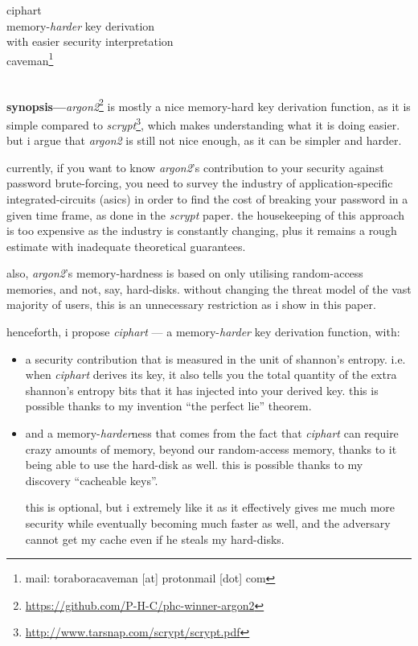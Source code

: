 \documentclass[twocolumn]{article}
\begin{document}
\SetInd{.15em}{1em}

\begin{center}
\Huge
ciphart\\
\LARGE
memory-\emph{harder} key derivation \\
with easier security interpretation\\
\normalsize
caveman\footnote{mail: toraboracaveman [at] protonmail [dot] com}\\
\footnotesize
\DTMnow\\
\end{center}

\noindent\textbf{synopsis---}\emph{argon2}\footnote{\url{https://github.com/P-H-C/phc-winner-argon2}}
is mostly a nice memory-hard key derivation function, as it is simple
compared to
\emph{scrypt}\footnote{\url{http://www.tarsnap.com/scrypt/scrypt.pdf}},
which makes understanding what it is doing easier.  but i argue that
\emph{argon2} is still not nice enough, as it can be simpler and harder.

currently, if you want to know \emph{argon2}'s contribution to your
security against password brute-forcing, you need to survey the industry of
application-specific integrated-circuits (asics) in order to find the cost
of breaking your password in a given time frame, as done in the
\emph{scrypt} paper.  the housekeeping of this approach is too expensive as
the industry is constantly changing, plus it remains a rough estimate with
inadequate theoretical guarantees.

also, \emph{argon2}'s memory-hardness is based on only utilising
random-access memories, and not, say, hard-disks.  without changing the
threat model of the vast majority of users, this is an unnecessary
restriction as i show in this paper.

henceforth, i propose \emph{ciphart} --- a memory-\emph{harder} key
derivation function, with:
\begin{itemize}
    \item a security contribution that is measured in the unit of shannon's
    entropy.  i.e. when \emph{ciphart} derives its key, it also tells you
    the total quantity of the extra shannon's entropy bits that it has
    injected into your derived key.  this is possible thanks to my
    invention ``the perfect lie'' theorem.
    \item and a memory-\emph{harder}ness that comes from the fact that
    \emph{ciphart} can require crazy amounts of memory, beyond our
    random-access memory, thanks to it being able to use the hard-disk as
    well.  this is possible thanks to my discovery ``cacheable keys''.

    this is optional, but i extremely like it as it effectively gives me
    much more security while eventually becoming much faster as well, and
    the adversary cannot get my cache even if he steals my hard-disks.
\end{itemize}
\end{document}
